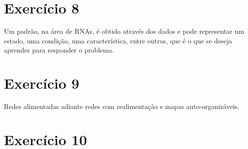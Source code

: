 \documentclass[a4]{article}
\begin{document}
\section*{Exercício 8}

Um padrão, na área de RNAs, é obtido através dos dados e pode representar um estado, uma condição, uma característica, entre outros, que é o que se deseja aprender para responder o problema.

\section*{Exercício 9}

Redes alimentadas adiante redes com realimentação e mapas auto-organizáveis.

\section*{Exercício 10}
\end{document}
